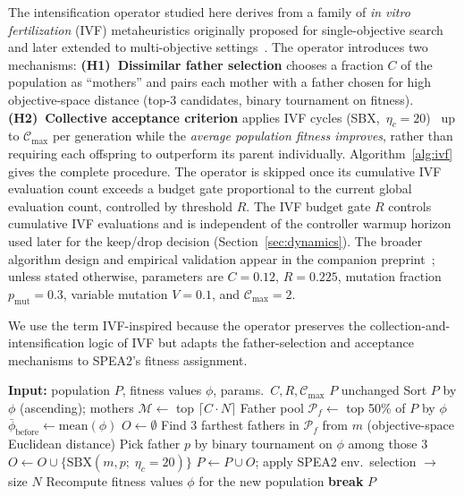\documentclass[conference]{IEEEtran}
\begin{document}
The intensification operator studied here derives from a family of
\emph{in vitro fertilization} (IVF) metaheuristics originally proposed for
single-objective search and later extended to multi-objective
settings~\cite{camilo-junior2011,sampaio2017ivf,sampaio2019ivf,Sampaio2024}.
The operator introduces two mechanisms:
\textbf{(H1)~Dissimilar father selection} chooses a fraction $C$ of the
population as ``mothers'' and pairs each mother with a father chosen for high
objective-space distance (top-3 candidates, binary tournament on fitness).
\textbf{(H2)~Collective acceptance criterion} applies IVF cycles
(SBX,~$\eta_c = 20$)~\cite{deb1995simulated} up to
$\mathcal{C}_{\max}$ per generation while the \emph{average population
	fitness improves}, rather than requiring each offspring to outperform its
parent individually.
Algorithm~\ref{alg:ivf} gives the complete procedure.
The operator is skipped once its cumulative IVF evaluation count exceeds a
budget gate proportional to the current global evaluation count, controlled by
threshold $R$. The IVF budget gate $R$ controls cumulative IVF evaluations and
is independent of the controller warmup horizon used later for the keep/drop
decision (Section~\ref{sec:dynamics}). The broader algorithm design and empirical validation
appear in the companion preprint~\cite{zambrano2026ivfspea2}; unless stated otherwise, parameters are
$C = 0.12$, $R = 0.225$, mutation fraction
$p_{\mathrm{mut}} = 0.3$, variable mutation $V = 0.1$,
and $\mathcal{C}_{\max} = 2$.

We use the term IVF-inspired because the operator preserves the
collection-and-intensification logic of IVF but adapts the father-selection
and acceptance mechanisms to SPEA2's fitness assignment.

\begin{algorithm}[t]
\caption{IVF operator (one generation)}\label{alg:ivf}
\begin{algorithmic}[1]\footnotesize
\State \textbf{Input:} population $P$, fitness values $\phi$, params.\ $C, R, \mathcal{C}_{\max}$
  \State \Return $P$ unchanged 
\EndIf
\State Sort $P$ by $\phi$ (ascending); mothers $\mathcal{M} \gets$ top $\lceil C \cdot N \rceil$
\State Father pool $\mathcal{P}_f \gets$ top 50\% of $P$ by $\phi$
  \State $\bar{\phi}_{\mathrm{before}} \gets \mathrm{mean}(\phi)$
  \State $O \gets \emptyset$
   
    \State Find 3 farthest fathers in $\mathcal{P}_f$ from $m$ (objective-space Euclidean distance)
    \State Pick father $p$ by binary tournament on $\phi$ among those 3
    \State $O \gets O \cup \{\mathrm{SBX}(m, p;\; \eta_c = 20)\}$
  \EndFor
  \State $P \gets P \cup O$; apply SPEA2 env.\ selection $\to$ size $N$
  \State Recompute fitness values $\phi$ for the new population
   
    \State \textbf{break} 
  \EndIf
\EndFor
\State \Return $P$
\end{algorithmic}
\end{algorithm}
\end{document}
